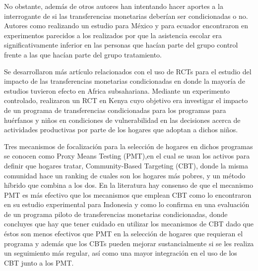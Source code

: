\documentclass[AER]{AEA}
\begin{document}
No obstante, además de \cite{Baird2011} otros autores han intentando hacer aportes a la interrogante  de si las transferencias monetarias deberían ser condicionadas o no. Autores como \cite{DeBrauw2011MustMexico} realizando un estudio para México y \cite{NorbertSchady2008CashEcuador} para ecuador encontraron en experimentos parecidos a los realizados por \cite{Baird2011} que la asistencia escolar era significativamente inferior en las personas que hacían parte del grupo control frente a las que hacían parte del grupo tratamiento.

Se desarrollaron más artículo relacionados con el uso de RCTs para el estudio del impacto de las transferencias monetarias condicionadas en donde la mayoría de estudios tuvieron efecto en Africa subsahariana. Mediante un experimento controlado, \cite{Asfaw2014CashKenya} realizaron un RCT en Kenya cuyo objetivo era investigar el impacto de un programa de transferencias condicionadas para los programas para huérfanos y niños en condiciones de vulnerabilidad en las decisiones acerca de actividades productivas por parte de los hogares que adoptan a dichos niños.

Tres mecanismos de focalización para la selección de hogares en dichos programas se conocen como Proxy Means Testing (PMT),en el cual se usan los activos para definir que hogares tratar, Community-Based Targeting (CBT), donde la misma comunidad hace un ranking de cuales son los hogares más pobres, y un método híbrido que combina a los dos. En la literatura hay consenso de que el mecanismo PMT es más efectivo que los mecanismos que emplean CBT como lo encontraron \cite{Alatas2012TargetingIndonesia} en su estudio experimental para Indonesia y como lo confirma \cite{Stoeffler2016ReachingCameroon} en una evaluación de un programa piloto de transferencias monetarias condicionadas, donde concluyes que hay que tener cuidado en utilizar los mecanismos de CBT dado que éstos son menos efectivos que PMT en la selección de hogares que requieran el programa y además que los CBTs pueden mejorar sustancialmente si se les realiza un seguimiento más regular, así como una mayor integración en el uso de los CBT junto a los PMT. 
\end{document}
